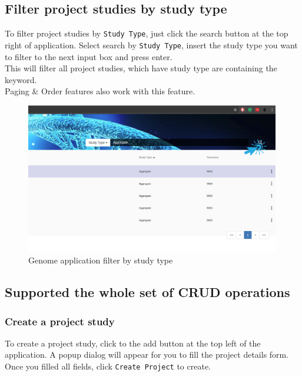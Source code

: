 \documentclass[a4paper,12pt]{article}
\begin{document}
\subsection{Filter project studies by study type}
To filter project studies by \texttt{Study Type}, just click the search button at the top right of application. Select search by \texttt{Study Type}, insert the study type you want to filter to the next input box and press enter.\\
This will filter all project studies, which have study type are containing the keyword.\\
Paging \& Order features also work with this feature.

\begin{figure}[H]
\centering
\includegraphics[width=0.99\textwidth]{images/genome-filter-studytype}
\caption{Genome application filter by study type}
\end{figure}

\subsection{Supported the whole set of CRUD operations}
\subsubsection{Create a project study}
To create a project study, click to the add button at the top left of the application. A popup dialog will appear for you to fill the project details form. Once you filled all fields, click \texttt{Create Project} to create. 
\end{document}
